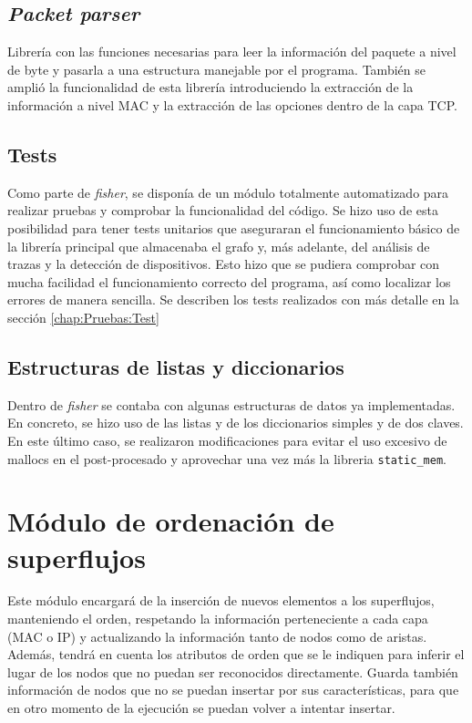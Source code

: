\documentclass[twoside, 12pt]{epstfg}
\begin{document}
\subsection{\textit{Packet parser}}
Librería con las funciones necesarias para leer la información del paquete a nivel de byte y pasarla a una estructura manejable por el programa. También se amplió la funcionalidad de esta librería introduciendo la extracción de la información a nivel MAC y la extracción de las opciones dentro de la capa TCP.
\subsection{Tests}
Como parte de \textit{fisher}, se disponía de un módulo totalmente automatizado para realizar pruebas y comprobar la funcionalidad del código. Se hizo uso de esta posibilidad para tener tests unitarios que aseguraran el funcionamiento básico de la librería principal que almacenaba el grafo y, más adelante, del análisis de trazas y la detección de dispositivos. Esto hizo que se pudiera comprobar con mucha facilidad el funcionamiento correcto del programa, así como localizar los errores de manera sencilla. Se describen los tests realizados con más detalle en la sección \ref{chap:Pruebas:Test}
\subsection{Estructuras de listas y diccionarios}
Dentro de \textit{fisher} se contaba con algunas estructuras de datos ya implementadas. En concreto, se hizo uso de las listas y de los diccionarios simples y de dos claves. En este último caso, se realizaron modificaciones para evitar el uso excesivo de mallocs en el post-procesado y aprovechar una vez más la libreria \texttt{static\_mem}.

\section{Módulo de ordenación de superflujos}
Este módulo encargará de la inserción de nuevos elementos a los superflujos, manteniendo el orden, respetando la información perteneciente a cada capa (MAC o IP) y actualizando la información tanto de nodos como de aristas. Además, tendrá en cuenta los atributos de orden que se le indiquen para inferir el lugar de los nodos que no puedan ser reconocidos directamente. Guarda también información de nodos que no se puedan insertar por sus características, para que en otro momento de la ejecución se puedan volver a intentar insertar.
\end{document}
